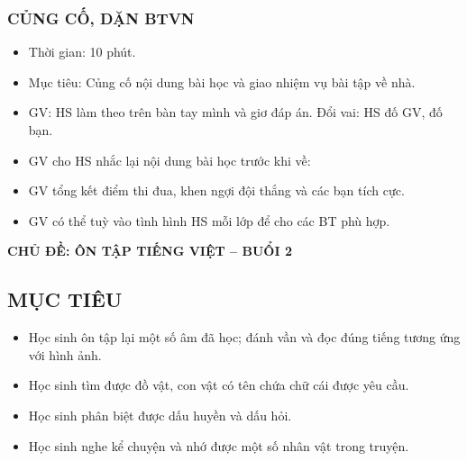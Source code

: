 \documentclass[../main.tex]{subfiles}
\begin{document}
\subsubsection{CỦNG CỐ, DẶN BTVN}
\begin{hd}
    \begin{itemize}
        \item Thời gian: 10 phút.
        \item Mục tiêu: Củng cố nội dung bài học và giao nhiệm vụ bài tập về nhà.
    \end{itemize}
\end{hd}
\begin{itemize}
    \item[-] GV:  HS làm theo trên bàn tay mình và giơ đáp án. Đổi vai: HS đố GV, đố bạn.
\end{itemize}
\begin{itemize}
    \item[-] GV cho HS nhắc lại nội dung bài học trước khi về: 
    \item[-] GV tổng kết điểm thi đua, khen ngợi đội thắng và các bạn tích cực.
    \item[-] GV có thể tuỳ vào tình hình HS mỗi lớp để cho các BT phù hợp.
\end{itemize}


\newpage
\begin{center}
    {\color{mauchinh!120}\bfseries\Large CHỦ ĐỀ: ÔN TẬP TIẾNG VIỆT -- BUỔI 2}
\end{center}
\setcounter{subsection}{0}
\subsection{MỤC TIÊU}
\begin{itemize}
    \item[-] Học sinh ôn tập lại một số âm đã học; đánh vần và đọc đúng tiếng tương ứng với hình ảnh.
    \item[-] Học sinh tìm được đồ vật, con vật có tên chứa chữ cái được yêu cầu.
    \item[-] Học sinh phân biệt được dấu huyền và dấu hỏi.
    \item[-] Học sinh nghe kể chuyện và nhớ được một số nhân vật trong truyện.
\end{itemize}
\end{document}
